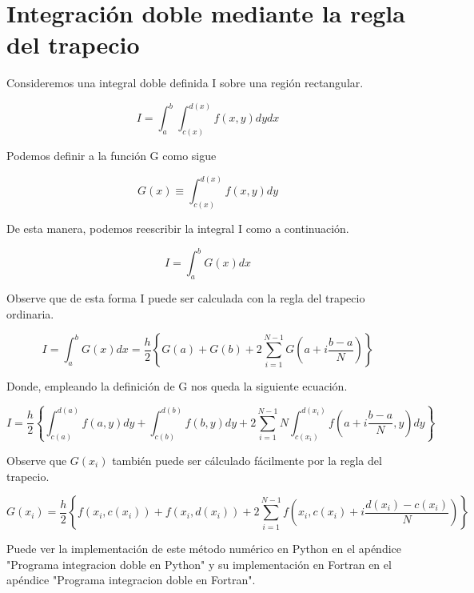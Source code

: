 \section{Integración doble mediante la regla del trapecio}

Consideremos una integral doble definida I sobre una región rectangular.

\begin{equation}
    I = \displaystyle\int_{a}^{b} \displaystyle\int_{c(x)}^{d(x)} 
    f(x,y) dy dx
\end{equation}

Podemos definir a la función G como sigue

\begin{equation}
    G(x) \equiv \displaystyle\int_{c(x)}^{d(x)} f(x,y) dy
\end{equation}

De esta manera, podemos reescribir la integral I como a continuación.

\begin{equation}
    I = \displaystyle\int_{a}^{b} G(x) dx
\end{equation}

Observe que de esta forma I puede ser calculada con la regla del trapecio ordinaria.

\begin{equation} 
    I =
    \displaystyle\int_{a}^{b} G(x) dx = 
    \frac{h}{2} \left\{ 
    G(a) + G(b) + 2\displaystyle\sum_{i=1}^{N-1} G(a + i \frac{b-a}{N})
    \right\}
\end{equation}

Donde, empleando la definición de G nos queda la siguiente ecuación.

\begin{equation} 
    I =
    \frac{h}{2} \left\{ 
        \displaystyle\int_{c(a)}^{d(a)} f(a,y) dy
        + \displaystyle\int_{c(b)}^{d(b)} f(b,y) dy
        + 2\displaystyle\sum_{i=1}^{N-1} {N}\displaystyle\int_{c(x_i)}^{d(x_i)} f(a + i \frac{b-a}{N},y) dy
    \right\}
\end{equation}

Observe que $G(x_i)$ también puede ser cálculado fácilmente por la regla del trapecio.

\begin{equation} 
     G(x_i) = 
    \frac{h}{2} \left\{ 
    f(x_i,c(x_i)) + f(x_i,d(x_i)) + 2\displaystyle\sum_{i=1}^{N-1} f(x_i, c(x_i) + i \frac{d(x_i)-c(x_i)}{N})
    \right\}
\end{equation}

Puede ver la implementación de este método numérico en Python en el apéndice "Programa integracion doble en Python" y su implementación en Fortran en el apéndice "Programa integracion doble en Fortran".